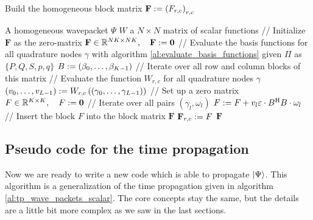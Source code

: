 \begin{algorithm}
\caption{Build the homogeneous block matrix $\mathbf{F} := \left(F_{r,c}\right)_{r,c}$}
\label{al:build_block_matrix_homog}
\begin{algorithmic}
  \REQUIRE A homogeneous wavepacket $\Psi$
  \REQUIRE $W$ a $N \times N$ matrix of scalar functions
  \STATE // Initialize $\mathbf{F}$ as the zero-matrix
  \STATE $\mathbf{F} \in \mathbb{R}^{NK \times NK}, \quad \mathbf{F} := \mathbf{0}$
  \STATE // Evaluate the basis functions for all quadrature nodes $\gamma$ with algorithm \ref{al:evaluate_basis_functions}
  \STATE given $\Pi$ as $\{P,Q,S,p,q\}$
  \STATE $B := \left(\beta_0, \ldots, \beta_{K-1}\right)$
  \STATE // Iterate over all row and column blocks of this matrix
      \STATE // Evaluate the function $W_{r,c}$ for all quadrature nodes $\gamma$
      \STATE $\left(v_0, \ldots, v_{L-1}\right) := W_{r,c}\left( \left(\gamma_0, \ldots, \gamma_{L-1}\right) \right)$
      \STATE // Set up a zero matrix
      \STATE $F \in \mathbb{R}^{K \times K}, \quad F := \mathbf{0}$
      \STATE // Iterate over all pairs $\left(\gamma_l, \omega_l\right)$
        \STATE $F := F + v_{l} \varepsilon \cdot B{}^{\textnormal{H}} B \cdot \omega_l$
      \ENDFOR
      \STATE // Insert the block $F$ into the block matrix $\mathbf{F}$
      \STATE $\mathbf{F}_{r,c} := F$
    \ENDFOR
  \ENDFOR
  \RETURN $\mathbf{F}$
\end{algorithmic}
\end{algorithm}

\subsection{Pseudo code for the time propagation}

Now we are ready to write a new code which is able to propagate $\Ket{\Psi}$. This
algorithm is a generalization of the time propagation given in algorithm \ref{al:tp_wave_packets_scalar}.
The core concepts stay the same, but the details are a little bit more complex as
we saw in the last sections.

